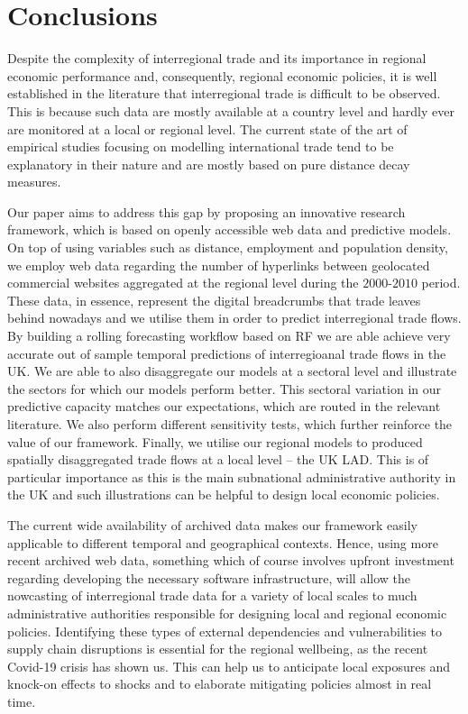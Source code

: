 \documentclass[]{interact}
\theoremstyle{plain}%
\theoremstyle{definition}
\theoremstyle{remark}
\begin{document}
\hypertarget{sec:6}{%
\section{Conclusions}\label{sec:6}}

Despite the complexity of interregional trade and its importance in
regional economic performance and, consequently, regional economic
policies, it is well established in the literature that interregional
trade is difficult to be observed. This is because such data are mostly
available at a country level and hardly ever are monitored at a local or
regional level. The current state of the art of empirical studies
focusing on modelling international trade tend to be explanatory in
their nature and are mostly based on pure distance decay measures.

Our paper aims to address this gap by proposing an innovative research
framework, which is based on openly accessible web data and predictive
models. On top of using variables such as distance, employment and
population density, we employ web data regarding the number of
hyperlinks between geolocated commercial websites aggregated at the
regional level during the \(2000\)-\(2010\) period. These data, in
essence, represent the digital breadcrumbs that trade leaves behind
nowadays and we utilise them in order to predict interregional trade
flows. By building a rolling forecasting workflow based on RF we are
able achieve very accurate out of sample temporal predictions of
interregioanal trade flows in the UK. We are able to also disaggregate
our models at a sectoral level and illustrate the sectors for which our
models perform better. This sectoral variation in our predictive
capacity matches our expectations, which are routed in the relevant
literature. We also perform different sensitivity tests, which further
reinforce the value of our framework. Finally, we utilise our regional
models to produced spatially disaggregated trade flows at a local level
-- the UK LAD. This is of particular importance as this is the main
subnational administrative authority in the UK and such illustrations
can be helpful to design local economic policies.

The current wide availability of archived data makes our framework
easily applicable to different temporal and geographical contexts.
Hence, using more recent archived web data, something which of course
involves upfront investment regarding developing the necessary software
infrastructure, will allow the nowcasting of interregional trade data
for a variety of local scales to much administrative authorities
responsible for designing local and regional economic policies.
Identifying these types of external dependencies and vulnerabilities to
supply chain disruptions is essential for the regional wellbeing, as the
recent Covid-19 crisis has shown us. This can help us to anticipate
local exposures and knock-on effects to shocks and to elaborate
mitigating policies almost in real time.
\end{document}
